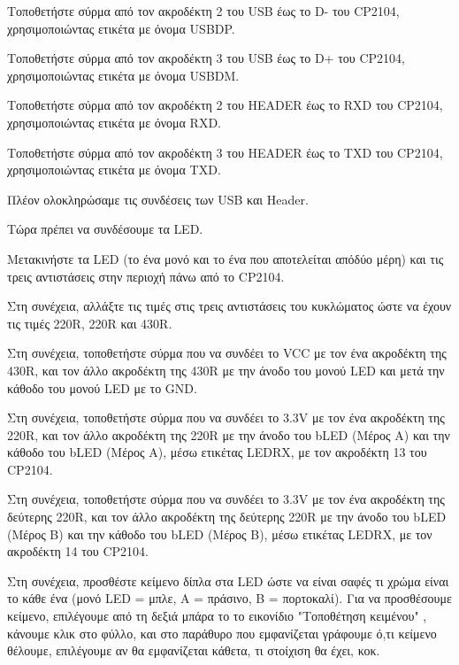\documentclass[a4paper]{article}
\begin{document}
Τοποθετήστε σύρμα από τον ακροδέκτη 2 του USB έως το D- του \textenglish{CP2104}, χρησιμοποιώντας ετικέτα με όνομα USBDP. 

Τοποθετήστε σύρμα από τον ακροδέκτη 3 του USB έως το D+ του \textenglish{CP2104}, χρησιμοποιώντας ετικέτα με όνομα USBDM.

Τοποθετήστε σύρμα από τον ακροδέκτη 2 του HEADER έως το RXD του \textenglish{CP2104}, χρησιμοποιώντας ετικέτα με όνομα RXD.

Τοποθετήστε σύρμα από τον ακροδέκτη 3 του HEADER έως το TXD του \textenglish{CP2104}, χρησιμοποιώντας ετικέτα με όνομα TXD.

Πλέον ολοκληρώσαμε τις συνδέσεις των USB και Header.

Τώρα πρέπει να συνδέσουμε τα \textenglish{LED}. 

Μετακινήστε τα \textenglish{LED} (το ένα μονό και το ένα που αποτελείται απόδύο μέρη) και τις τρεις αντιστάσεις στην περιοχή πάνω από το \textenglish{CP2104}.

Στη συνέχεια, αλλάξτε τις τιμές στις τρεις αντιστάσεις του κυκλώματος ώστε να έχουν τις τιμές 220R, 220R και 430R.

Στη συνέχεια, τοποθετήστε σύρμα που να συνδέει το VCC με τον ένα ακροδέκτη της 430R, και τον άλλο ακροδέκτη της 430R με την άνοδο του μονού \textenglish{LED} και μετά την κάθοδο του μονού \textenglish{LED} με το GND.

Στη συνέχεια, τοποθετήστε σύρμα που να συνδέει το 3.3V με τον ένα ακροδέκτη της 220R, και τον άλλο ακροδέκτη της 220R με την άνοδο του b\textenglish{LED} (Μέρος Α) και την κάθοδο του b\textenglish{LED} (Μέρος Α), μέσω ετικέτας \textenglish{LED}RX, με τον ακροδέκτη 13 του \textenglish{CP2104}.

Στη συνέχεια, τοποθετήστε σύρμα που να συνδέει το 3.3V με τον ένα ακροδέκτη της δεύτερης 220R, και τον άλλο ακροδέκτη της δεύτερης 220R με την άνοδο του b\textenglish{LED} (Μέρος Β) και την κάθοδο του b\textenglish{LED} (Μέρος Β), μέσω ετικέτας \textenglish{LED}RX, με τον ακροδέκτη 14 του \textenglish{CP2104}.

Στη συνέχεια, προσθέστε κείμενο δίπλα στα \textenglish{LED} ώστε να είναι σαφές τι χρώμα είναι το κάθε ένα (μονό \textenglish{LED} = μπλε, A = πράσινο, B = πορτοκαλί). Για να προσθέσουμε κείμενο, επιλέγουμε από τη δεξιά μπάρα το το εικονίδιο "Τοποθέτηση κειμένου" %
, κάνουμε κλικ στο φύλλο, και στο παράθυρο που εμφανίζεται γράφουμε ό,τι κείμενο θέλουμε, επιλέγουμε αν θα εμφανίζεται κάθετα, τι στοίχιση θα έχει, κοκ.
\end{document}
